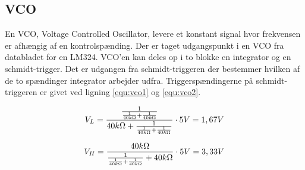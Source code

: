\subsection{VCO}
\label{volumenkontrol-simulering-vco}

En VCO, Voltage Controlled Oscillator, levere et konstant signal hvor frekvensen er afhængig af en kontrolspænding. Der er taget udgangspunkt i en VCO fra databladet for en LM324. VCO'en kan deles op i to blokke en integrator og en schmidt-trigger. Det er udgangen fra schmidt-triggeren der bestemmer hvilken af de to spændinger integrator arbejder udfra. Triggerspændingerne på schmidt-triggeren er givet ved ligning \ref{equ:vco1} og \ref{equ:vco2}.

\begin{equation}
\label{equ:vco1}
V_L = \frac{\frac{1}{\frac{1}{40 k\ohm} + \frac{1}{40 k\ohm}}}{40 k\ohm + \frac{1}{\frac{1}{40 k\ohm} + \frac{1}{40 k\ohm}}} \cdot 5 V = 1,67 V
\end{equation}

\begin{equation}
\label{equ:vco2}
V_H = \frac{40 k\ohm}{\frac{1}{\frac{1}{40 k\ohm} + \frac{1}{40 k\ohm}} + 40 k\ohm} \cdot 5 V = 3,33 V
\end{equation}

